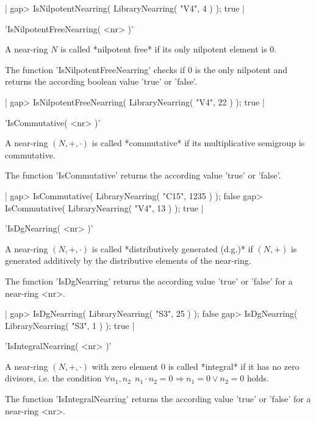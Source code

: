 |  gap> IsNilpotentNearring( LibraryNearring( "V4", 4 ) );
  true
|

   
'IsNilpotentFreeNearring( <nr> )'  

A near-ring $N$ is called *nilpotent free* if its only nilpotent
element is $0$.

The function 'IsNilpotentFreeNearring' checks if 
$0$ is the only nilpotent and returns the according boolean value 
'true' or 'false'.

|  gap> IsNilpotentFreeNearring( LibraryNearring( "V4", 22 ) );       
  true
|

   
'IsCommutative( <nr> )'  

A near-ring $(N,+,\cdot)$ is called *commutative* if 
its multiplicative semigroup is commutative.

The function 'IsCommutative' returns 
the according value 'true' or 'false'.

|  gap> IsCommutative( LibraryNearring( "C15", 1235 ) );       
  false
  gap> IsCommutative( LibraryNearring( "V4", 13 ) );   
  true
|

   
'IsDgNearring( <nr> )'  

A near-ring $(N,+,\cdot)$ is called *distributively generated (d.g.)* if 
$(N,+)$ is generated additively by the distributive elements of the
near-ring.

The function 'IsDgNearring' returns 
the according value 'true' or 'false' for a near-ring <nr>.

|  gap> IsDgNearring( LibraryNearring( "S3", 25 ) ); 
  false
  gap> IsDgNearring( LibraryNearring( "S3", 1 ) ); 
  true
|

   
'IsIntegralNearring( <nr> )'  

A near-ring $(N,+,\cdot)$ with zero element $0$ is called *integral* if 
it has no zero divisors, i.e. the condition $\forall n_1,n_2\:\ 
n_1 \cdot n_2 = 0 \Rightarrow n_1 = 0 \lor n_2 = 0$ holds.

The function 'IsIntegralNearring' returns 
the according value 'true' or 'false' for a near-ring <nr>.

